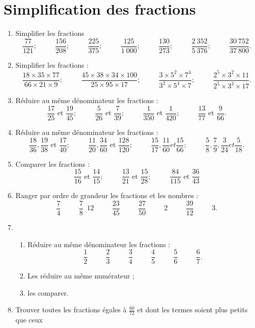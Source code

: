 \documentclass[12 pt]{report}
\theoremstyle{plain}
\newcounter{n}
\begin{document}
\chapter*{Simplification des fractions}

\begin{enumerate}
\item Simplifier les fractions 
\[ \frac{77}{121}; \phantom{meow}
\frac{156}{208};\phantom{meow}
\frac{225}{375};\phantom{meow}
\frac{125}{1~000};\phantom{meow}
\frac{130}{273}; \phantom{meow}
\frac{2~352}{5~376}; \phantom{meow}
\frac{30~752}{37~800}.\]
\item Simplifier les fractions : 
\[\frac{18\times 35\times77}{66\times 21\times9}; 
\phantom{meow} \frac{45\times 38\times 34\times 100}{25\times 95\times 17};\phantom{meow}\frac{3\times 5^2\times7^4}{3^2\times5^4\times 7};\phantom{meow}\frac{2^5\times3^2\times11}{2^5\times3^3\times17}.\]
\item Réduire au même dénominateur les fractions : 
\[ \frac{17}{25}\text{  et  }\frac{19}{45};\phantom{meow}
\frac{5}{26}\text{  et  }\frac{7}{39};\phantom{meow}
\frac1{350}\text{  et  }\frac1{420};\phantom{meow}
\frac{13}{77}\text{  et  }\frac{9}{66}.\]
\item Réduire au même dénominateur les fractions : 
\[\frac{18}{36}, \frac{19}{38}\text{  et  }\frac{17}{40}; \phantom{meow} 
\frac{11}{20}, \frac{34}{60} \text{  et  }\frac{128}{120}; \phantom{meow}
\frac{15}{17}, \frac{11}{60} et \frac{15}{66}; \phantom{meow}
\frac58, \frac79, \frac3{24} et \frac5{18}.\]
\item Comparer les fractions : \[\frac{15}{16}\text{  et  }\frac{14}{15}; \phantom{meow}\frac{13}{21}\text{  et  }\frac{15}{28}; \phantom{meow}\frac{84}{115}\text{  et  }\frac{36}{43}\]
\item Ranger par ordre de grandeur les fractions et les nombres : \[\frac74 \phantom{meow}\frac78\phantom{5}{12}\phantom{meow}\frac{23}{45}
\phantom{meow}\frac{27}{50}\phantom{meow}2\phantom{meow}\frac{39}{12}\phantom{meow}3.\]
\item \begin{enumerate}
\item Réduire au même dénominateur les fractions : 
\[\frac12\phantom{meow}\frac23\phantom{meow}\frac34
\phantom{meow}\frac45\phantom{meow}\frac56\phantom{meow}\frac67.\]
\item Les réduire au même numérateur ; 
\item les comparer. 
\end{enumerate}
\item Trouver toutes les fractions égales à $\frac{60}{72}$ et dont les termes soient plus petits que ceux

\end{enumerate}
\end{document}

